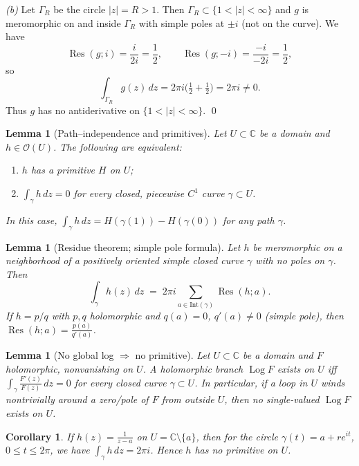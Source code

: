 \documentclass[11pt,a4paper]{article}
\newtheorem{corollary}[theorem]{Corollary}
\theoremstyle{definition}
\theoremstyle{definition}
\theoremstyle{plain}
\newtheorem{lemma}[exercise]{Lemma}
\theoremstyle{remark}
\DeclareMathOperator{\Log}{Log}
\begin{document}
\medskip
\emph{(b)} Let $\Gamma_R$ be the circle $|z|=R>1$.
Then $\Gamma_R\subset\{1<|z|<\infty\}$ and $g$ is meromorphic on and inside $\Gamma_R$
with simple poles at $\pm i$ (not on the curve). We have
\[
\operatorname{Res}(g;i)=\frac{i}{2i}=\frac12,\qquad
\operatorname{Res}(g;-i)=\frac{-i}{-2i}=\frac12,
\]
so
\[
\int_{\Gamma_R} g(z)\,dz = 2\pi i\Big(\tfrac12+\tfrac12\Big)=2\pi i\neq 0.
\]
Thus $g$ has no antiderivative on $\{1<|z|<\infty\}$.
\qed

\begin{lemma}[Path–independence and primitives]
	Let $U\subset\mathbb C$ be a domain and $h\in\mathcal O(U)$. The following are equivalent:
	\begin{enumerate}
		\item $h$ has a primitive $H$ on $U$;
		\item $\displaystyle \int_\gamma h\,dz=0$ for every closed, piecewise $C^1$ curve $\gamma\subset U$.
	\end{enumerate}
	In this case, $\displaystyle \int_{\gamma} h\,dz = H(\gamma(1))-H(\gamma(0))$ for any path $\gamma$.
\end{lemma}

\begin{lemma}[Residue theorem; simple pole formula]
	Let $h$ be meromorphic on a neighborhood of a positively oriented simple closed curve $\gamma$
	with no poles on $\gamma$. Then
	\[
	\int_\gamma h(z)\,dz \;=\; 2\pi i \sum_{a\in \mathrm{Int}(\gamma)} \operatorname{Res}(h;a).
	\]
	If $h=p/q$ with $p,q$ holomorphic and $q(a)=0$, $q'(a)\neq 0$ (simple pole), then
	$\displaystyle \operatorname{Res}(h;a)=\frac{p(a)}{q'(a)}$.
\end{lemma}

\begin{lemma}[No global log $\Rightarrow$ no primitive]
	Let $U\subset\mathbb C$ be a domain and $F$ holomorphic, nonvanishing on $U$.
	A holomorphic branch $\Log F$ exists on $U$ iff $\displaystyle \int_\gamma \frac{F'(z)}{F(z)}\,dz=0$
	for every closed curve $\gamma\subset U$. In particular, if a loop in $U$ winds nontrivially
	around a zero/pole of $F$ from outside $U$, then no single-valued $\Log F$ exists on $U$.
\end{lemma}

\begin{corollary}
	If $h(z)=\frac{1}{z-a}$ on $U=\mathbb C\setminus\{a\}$, then for the circle
	$\gamma(t)=a+re^{it}$, $0\le t\le 2\pi$, we have $\displaystyle \int_\gamma h\,dz=2\pi i$.
	Hence $h$ has no primitive on $U$.
\end{corollary}
\end{document}
